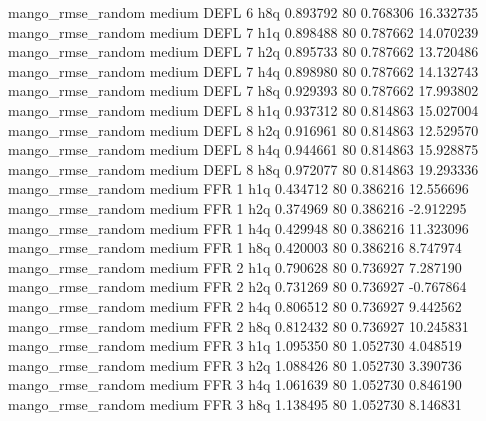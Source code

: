 mango_rmse_random     medium     DEFL                 6                  h8q  0.893792 80       0.768306          16.332735
mango_rmse_random     medium     DEFL                 7                  h1q  0.898488 80       0.787662          14.070239
mango_rmse_random     medium     DEFL                 7                  h2q  0.895733 80       0.787662          13.720486
mango_rmse_random     medium     DEFL                 7                  h4q  0.898980 80       0.787662          14.132743
mango_rmse_random     medium     DEFL                 7                  h8q  0.929393 80       0.787662          17.993802
mango_rmse_random     medium     DEFL                 8                  h1q  0.937312 80       0.814863          15.027004
mango_rmse_random     medium     DEFL                 8                  h2q  0.916961 80       0.814863          12.529570
mango_rmse_random     medium     DEFL                 8                  h4q  0.944661 80       0.814863          15.928875
mango_rmse_random     medium     DEFL                 8                  h8q  0.972077 80       0.814863          19.293336
mango_rmse_random     medium      FFR                 1                  h1q  0.434712 80       0.386216          12.556696
mango_rmse_random     medium      FFR                 1                  h2q  0.374969 80       0.386216          -2.912295
mango_rmse_random     medium      FFR                 1                  h4q  0.429948 80       0.386216          11.323096
mango_rmse_random     medium      FFR                 1                  h8q  0.420003 80       0.386216           8.747974
mango_rmse_random     medium      FFR                 2                  h1q  0.790628 80       0.736927           7.287190
mango_rmse_random     medium      FFR                 2                  h2q  0.731269 80       0.736927          -0.767864
mango_rmse_random     medium      FFR                 2                  h4q  0.806512 80       0.736927           9.442562
mango_rmse_random     medium      FFR                 2                  h8q  0.812432 80       0.736927          10.245831
mango_rmse_random     medium      FFR                 3                  h1q  1.095350 80       1.052730           4.048519
mango_rmse_random     medium      FFR                 3                  h2q  1.088426 80       1.052730           3.390736
mango_rmse_random     medium      FFR                 3                  h4q  1.061639 80       1.052730           0.846190
mango_rmse_random     medium      FFR                 3                  h8q  1.138495 80       1.052730           8.146831
